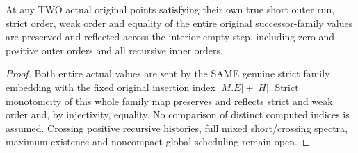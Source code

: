\begin{corollary}
\label{hir:original-general-entire-short-family-order}
\leanok
At any TWO actual original points satisfying their own true short outer run,
strict order, weak order and equality of the entire original successor-family
values are preserved and reflected across the interior empty step, including
zero and positive outer orders and all recursive inner orders.
\end{corollary}
\begin{proof}
Both entire actual values are sent by the SAME genuine strict family embedding
with the fixed original insertion index $|M.E|+|H|$. Strict monotonicity of this
whole family map preserves and reflects strict and weak order and, by
injectivity, equality. No comparison of distinct computed indices is assumed.
Crossing positive recursive histories, full mixed short/crossing spectra,
maximum existence and noncompact global scheduling remain open.
\end{proof}
